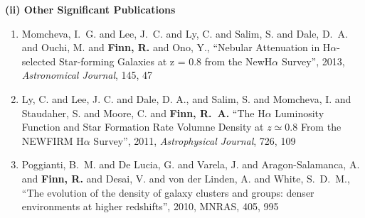 \documentclass[11pt]{article}
\begin{document}
\begin{flushleft}
\medskip
{\bf (ii) Other Significant Publications} \\
\medskip
\vspace{-.3cm}
\begin{enumerate}{\setlength{\leftmargin}{0in}}
 \item {Momcheva}, I.~G. and {Lee}, J.~C. and {Ly}, C. and {Salim}, S. and 
 	{Dale}, D.~A. and {Ouchi}, M. and {\bf {Finn}, R.} and {Ono}, Y.,
       ``{Nebular Attenuation in H{$\alpha$}-selected Star-forming
         Galaxies at z = 0.8 from the NewH{$\alpha$} Survey}'', 2013,
       {\it Astronomical Journal},  145, 47
 \vspace{-.2cm}
 \item Ly, C. and Lee, J. C. and Dale, D. A., and Salim, S. and Momcheva, I. and Staudaher, S. and Moore, C. and {\bf {Finn}, R.~A.} 
 ``The H$\alpha$ Luminosity Function and Star Formation Rate Volumne
 Density at $z \simeq 0.8$ From the NEWFIRM H$\alpha$ Survey'', 2011, 
 {\it Astrophysical Journal}, 726, 109
 \vspace{-.2cm}
\item {Poggianti}, B.~M. and {De Lucia}, G. and {Varela}, J. and {Aragon-Salamanca}, A. and 
	{\bf {Finn}, R.} and {Desai}, V. and {von der Linden}, A. and {White}, S.~D.~M.,
{``The evolution of the density of galaxy clusters and groups: denser environments at higher redshifts''},
2010, MNRAS, 405, 995
\vspace{-.2cm}

\end{enumerate}
\end{flushleft}
\end{document}

